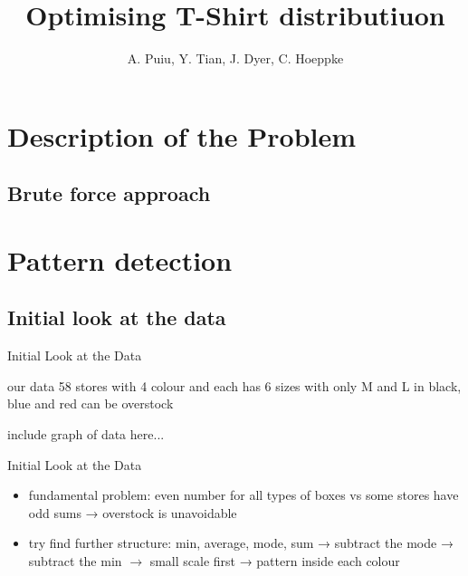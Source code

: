 \documentclass{beamer}
\title[T-Shirt Problem]{Optimising T-Shirt distributiuon} %
\author{A. Puiu, Y. Tian, J. Dyer, C. Hoeppke} %
\institute[University of Oxford] %
{
\textit{Department for Mathematics} %
\date{\today} %
}
\begin{document}
\begin{frame}
\titlepage %
\end{frame}

\section{Description of the Problem}


\subsection{Brute force approach}



\section{Pattern detection}


\subsection{Initial look at the data}

\begin{frame}{Initial Look at the Data}
\begin{block}{our data}
	58 stores with 4 colour and each has 6 sizes with only M and L in black, blue and red can be overstock 
\end{block}
include graph of data here...
\end{frame}

\begin{frame}{Initial Look at the Data}
 \begin{itemize}
	\item fundamental problem: 
	even number for all types of boxes vs some stores have odd sums → overstock is unavoidable
	\item try find further structure:
	min, average, mode, sum → subtract the mode → subtract the min $\rightarrow$ small scale first → pattern inside each colour
\end{itemize}
\end{frame}
\end{document}
